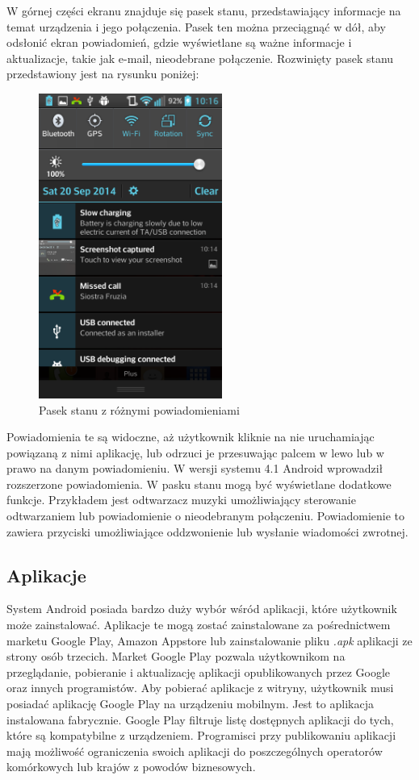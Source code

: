 W górnej części ekranu znajduje się pasek stanu, przedstawiający informacje na temat urządzenia i jego połączenia. Pasek ten można przeciągnąć w dół, aby odsłonić ekran powiadomień, gdzie wyświetlane są ważne informacje i aktualizacje, takie jak e-mail, nieodebrane połączenie. Rozwinięty pasek stanu przedstawiony jest na rysunku poniżej:

\begin{figure}[H] 
\centering\includegraphics[width=6cm]{figures/android/statusbar}
\caption{Pasek stanu z różnymi powiadomieniami}
\end{figure}

Powiadomienia te są widoczne, aż użytkownik kliknie na nie uruchamiając powiązaną z nimi aplikację, lub odrzuci je przesuwając palcem w lewo lub w prawo na danym powiadomieniu. W wersji systemu 4.1 Android wprowadził rozszerzone powiadomienia. W pasku stanu mogą być wyświetlane dodatkowe funkcje. Przykładem jest odtwarzacz muzyki umożliwiający sterowanie odtwarzaniem lub powiadomienie o nieodebranym połączeniu. Powiadomienie to zawiera przyciski umożliwiające oddzwonienie lub wysłanie wiadomości zwrotnej.\cite{android:31}

\subsection{Aplikacje}

System Android posiada bardzo duży wybór wśród aplikacji, które użytkownik może zainstalować. Aplikacje te mogą zostać zainstalowane za pośrednictwem marketu Google Play, Amazon Appstore lub zainstalowanie pliku \emph{.apk} aplikacji ze strony osób trzecich.\cite{android:32} Market Google Play pozwala użytkownikom na przeglądanie, pobieranie i aktualizację aplikacji opublikowanych przez Google oraz innych programistów. Aby pobierać aplikacje z witryny, użytkownik musi posiadać aplikację Google Play na urządzeniu mobilnym. Jest to aplikacja instalowana fabrycznie. Google Play filtruje listę dostępnych aplikacji do tych, które są kompatybilne z urządzeniem. Programisci przy publikowaniu aplikacji mają możliwość ograniczenia swoich aplikacji do poszczególnych operatorów komórkowych lub krajów z powodów biznesowych.\cite{android:33}

